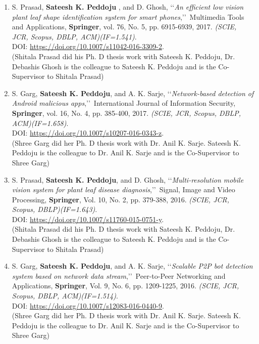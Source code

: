 \begin{enumerate}
	\item
	S. Prasad, \textbf{Sateesh K. Peddoju} , and D. Ghosh, \lq\lq \textit{An efficient low vision plant leaf shape identification system for smart phones},\rq\rq\, Multimedia Tools and Applications, \textbf{Springer}, vol. 76, No. 5, pp. 6915-6939, 2017. \emph{(SCIE, JCR, Scopus, DBLP, ACM)(IF=1.541)}. \\DOI: \url{https://doi.org/10.1007/s11042-016-3309-2}.  \\(Shitala Prasad did his Ph. D thesis work with Sateesh K. Peddoju, Dr. Debashis Ghosh is the colleague to Sateesh K. Peddoju and is the Co-Supervisor to Shitala Prasad)
	
	\item
	S. Garg, \textbf{Sateesh K. Peddoju}, and A. K. Sarje, \lq\lq \textit{Network-based detection of Android malicious apps},\rq\rq\, International Journal of Information Security, \textbf{Springer}, vol. 16, No. 4, pp. 385-400, 2017. \emph{(SCIE, JCR, Scopus, DBLP, ACM)(IF=1.658)}. \\DOI: \url{https://doi.org/10.1007/s10207-016-0343-z}. \\(Shree Garg did her Ph. D thesis work with Dr. Anil K. Sarje.  Sateesh K. Peddoju is the colleague to Dr. Anil K. Sarje and is the Co-Supervisor to Shree Garg)
	
	\item
	S. Prasad, \textbf{Sateesh K. Peddoju}, and D. Ghosh, \lq\lq \textit{Multi-resolution mobile vision system for plant leaf disease diagnosis},\rq\rq\, Signal, Image and Video Processing, \textbf{Springer}, Vol. 10, No. 2, pp. 379-388, 2016. \emph{(SCIE, JCR,  Scopus, DBLP)(IF=1.643)}. \\DOI: \url{https://doi.org/10.1007/s11760-015-0751-y}.  \\(Shitala Prasad did his Ph. D thesis work with Sateesh K. Peddoju, Dr. Debashis Ghosh is the colleague to Sateesh K. Peddoju and is the Co-Supervisor to Shitala Prasad)
	
	\item
	S. Garg, \textbf{Sateesh K. Peddoju}, and A. K. Sarje, \lq\lq \textit{Scalable P2P bot detection system based on network data stream},\rq\rq\, Peer-to-Peer Networking and Applications, \textbf{Springer}, Vol. 9, No. 6, pp. 1209-1225, 2016. \emph{(SCIE, JCR, Scopus, DBLP, ACM)(IF=1.514)}. \\DOI: \url{https://doi.org/10.1007/s12083-016-0440-9}. \\(Shree Garg did her Ph. D thesis work with Dr. Anil K. Sarje.  Sateesh K. Peddoju is the colleague to Dr. Anil K. Sarje and is the Co-Supervisor to Shree Garg)
	

\end{enumerate}
